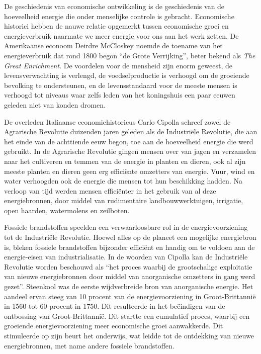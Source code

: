 \begin{blockquotebox}
    De geschiedenis van economische ontwikkeling is de geschiedenis van de hoeveelheid energie die onder menselijke controle is gebracht. Economische historici hebben de nauwe relatie opgemerkt tussen economische groei en energieverbruik naarmate we meer energie voor ons aan het werk zetten. De Amerikaanse econoom Deirdre McCloskey noemde de toename van het energieverbruik dat rond 1800 begon ``de Grote Verrijking'', beter bekend als \textit{The Great Enrichment}. De voordelen voor de mensheid zijn enorm geweest, de levensverwachting is verlengd, de voedselproductie is verhoogd om de groeiende bevolking te ondersteunen, en de levensstandaard voor de meeste mensen is verhoogd tot niveaus waar zelfs leden van het koningshuis een paar eeuwen geleden niet van konden dromen.
    \par\vspace{1em}\noindent
    De overleden Italiaanse economiehistoricus Carlo Cipolla schreef zowel de Agrarische Revolutie duizenden jaren geleden als de Industriële Revolutie, die aan het einde van de achttiende eeuw begon, toe aan de hoeveelheid energie die werd gebruikt. In de Agrarische Revolutie gingen mensen over van jagen en verzamelen naar het cultiveren en temmen van de energie in planten en dieren, ook al zijn meeste planten en dieren geen erg efficiënte omzetters van energie. Vuur, wind en water verhoogden ook de energie die mensen tot hun beschikking hadden. Na verloop van tijd werden mensen efficiënter in het gebruik van al deze energiebronnen, door middel van rudimentaire landbouwwerktuigen, irrigatie, open haarden, watermolens en zeilboten.
    \par\vspace{1em}\noindent
    Fossiele brandstoffen speelden een verwaarloosbare rol in de energievoorziening tot de Industriële Revolutie. Hoewel alles op de planeet een mogelijke energiebron is, bleken fossiele brandstoffen bijzonder efficiënt en handig om te voldoen aan de energie-eisen van industrialisatie. In de woorden van Cipolla kan de Industriële Revolutie worden beschouwd als ``het proces waarbij de grootschalige exploitatie van nieuwe energiebronnen door middel van anorganische omzetters in gang werd gezet''. Steenkool was de eerste wijdverbreide bron van anorganische energie. Het aandeel ervan steeg van 10 procent van de energievoorziening in Groot-Brittannië in 1560 tot 60 procent in 1750. Dit resulteerde in het beëindigen van de ontbossing van Groot-Brittannië. Dit startte een cumulatief proces, waarbij een groeiende energievoorziening meer economische groei aanwakkerde. Dit stimuleerde op zijn beurt het onderwijs, wat leidde tot de ontdekking van nieuwe energiebronnen, met name andere fossiele brandstoffen.

\end{blockquotebox}
